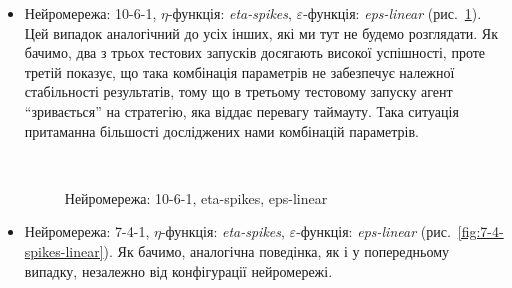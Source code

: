 \documentclass[a4paper,10pt,fleqn]{article}
\begin{document}
\begin{itemize}
\item Нейромережа: 10-6-1, $\eta$-функція: \textit{eta-spikes}, $\varepsilon$-функція: \textit{eps-linear} (рис.~\ref{fig:10-6-spikes-linear}). Цей випадок аналогічний до усіх інших, які ми тут не будемо розглядати. Як бачимо, два з трьох тестових запусків досягають високої успішності, проте третій показує, що така комбінація параметрів не забезпечує належної стабільності результатів, тому що в третьому тестовому запуску агент ``зривається'' на стратегію, яка віддає перевагу таймауту. Така ситуація притаманна більшості досліджених нами комбінацій параметрів.

\begin{figure}[h!]
  \centering
  \,
  \,
  \caption{Нейромережа: 10-6-1, eta-spikes, eps-linear}
  \label{fig:10-6-spikes-linear}
\end{figure}

\item Нейромережа: 7-4-1, $\eta$-функція: \textit{eta-spikes}, $\varepsilon$-функція: \textit{eps-linear} (рис.~\ref{fig:7-4-spikes-linear}). Як бачимо, аналогічна поведінка, як і у попередньому випадку, незалежно від конфігурації нейромережі.


\end{itemize}
\end{document}
